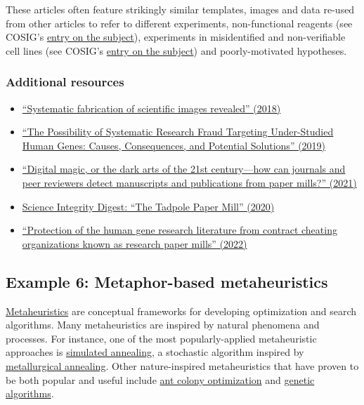 \documentclass[letterpaper, 12pt]{article}
\begin{document}
These articles often feature strikingly similar templates, images and data re-used from other articles to refer to different experiments, non-functional reagents (see COSIG's \href{https://osf.io/2egvz}{entry on the subject}), experiments in misidentified and non-verifiable cell lines (see COSIG's \href{https://osf.io/d7we5}{entry on the subject}) and poorly-motivated hypotheses.

\subsubsection*{Additional resources}

\begin{itemize}
    \setlength\itemsep{-0.5em}
    \item \href{https://doi.org/10.1002/1873-3468.13201}{``Systematic fabrication of scientific images revealed'' (2018)}
    \item \href{https://doi.org/10.1177/1177271919829162}{``The Possibility of Systematic Research Fraud Targeting Under-Studied Human Genes: Causes, Consequences, and Potential Solutions'' (2019)}
    \item \href{https://doi.org/10.1002/1873-3468.13747}{``Digital magic, or the dark arts of the 21st century—how can journals and peer reviewers detect manuscripts and publications from paper mills?'' (2021)}
    \item \href{https://scienceintegritydigest.com/2020/02/21/the-tadpole-paper-mill/}{Science Integrity Digest: ``The Tadpole Paper Mill'' (2020)}
    \item \href{https://doi.org/10.1093/nar/gkac1139}{``Protection of the human gene research literature from contract cheating organizations known as research paper mills'' (2022)}

\end{itemize}

\subsection*{Example 6: Metaphor-based metaheuristics}

\href{https://en.wikipedia.org/wiki/Metaheuristic}{Metaheuristics} are conceptual frameworks for developing optimization and search algorithms. Many metaheuristics are inspired by natural phenomena and processes. For instance, one of the most popularly-applied metaheuristic approaches is \href{https://en.wikipedia.org/wiki/Simulated_annealing}{simulated annealing}, a stochastic algorithm inspired by \href{https://en.wikipedia.org/wiki/Annealing_(materials_science)}{metallurgical annealing}. Other nature-inspired metaheuristics that have proven to be both popular and useful include \href{https://en.wikipedia.org/wiki/Ant_colony_optimization_algorithms}{ant colony optimization} and \href{https://en.wikipedia.org/wiki/Genetic_algorithm}{genetic algorithms}.
\end{document}
